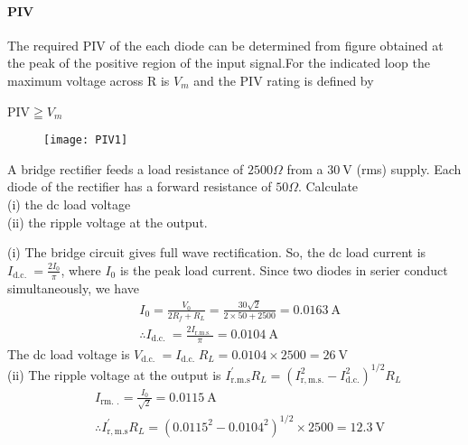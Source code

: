 \paragraph{PIV}
The required PIV of the each diode can be determined from figure obtained at the peak of the positive region of the input signal.For the indicated loop the maximum voltage across R is $V_m$ and the PIV rating is defined by
\begin{minipage}{0.5\textwidth}
\begin{center}
	PIV$\geqq V_m$ 
\end{center}
\end{minipage}
\begin{minipage}{0.5\textwidth}
\begin{figure}[H]
	\centering
	\texttt{[image: PIV1]}
	\caption{}
	\label{}
\end{figure}
\end{minipage}
\begin{exercise}
A bridge rectifier feeds a load resistance of $2500 \Omega$ from a $30 \mathrm{~V}$ (rms) supply. Each diode of the rectifier has a forward resistance of $50 \Omega$. Calculate\\
(i) the dc load voltage\\
(ii) the ripple voltage at the output.
\end{exercise}
\begin{answer}
(i) The bridge circuit gives full wave rectification. So, the dc load current is $I_{\text {d.c. }}=\frac{2 I_{0}}{\pi}$, where $I_{0}$ is the peak load current. Since two diodes in serier conduct simultaneously, we have
$$
\begin{aligned}
&I_{0}=\frac{V_{0}}{2 R_{f}+R_{L}}=\frac{30 \sqrt{2}}{2 \times 50+2500}=0.0163 \mathrm{~A} \\
&\therefore I_{\text {d.c. }}=\frac{2 I_{\text {r.m.s. }}}{\pi}=0.0104 \mathrm{~A}
\end{aligned}
$$
The dc load voltage is $V_{\text {d.c. }}=I_{\text {d.c. }} R_{L}=0.0104 \times 2500=26 \mathrm{~V}$\\
(ii) The ripple voltage at the output is $I_{\mathrm{r} . \mathrm{m} . \mathrm{s}}^{\prime} R_{L}=\left(I_{\mathrm{r}, \mathrm{m} . \mathrm{s} .}^{2}-I_{\mathrm{d} . \mathrm{c} .}^{2}\right)^{1 / 2} R_{L}$
$$
\begin{aligned}
&I_{\text {rm. } .}=\frac{I_{0}}{\sqrt{2}}=0.0115 \mathrm{~A} \\
&\therefore I_{\mathrm{r}, \mathrm{m} . \mathrm{s}}^{\prime} R_{L}=\left(0.0115^{2}-0.0104^{2}\right)^{1 / 2} \times 2500=12.3 \mathrm{~V}
\end{aligned}
$$
\end{answer}
